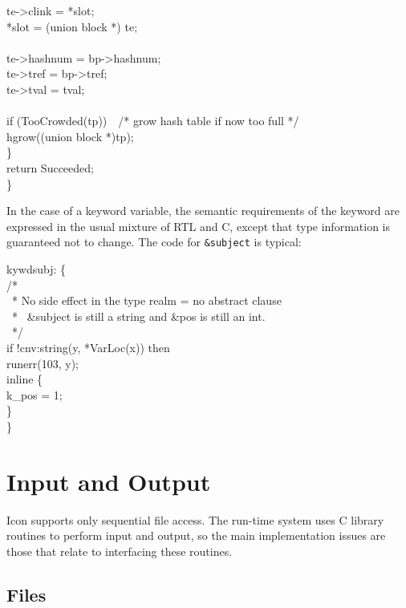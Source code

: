 \begin{iconcode}
\>\>te->clink = *slot;\\
\>\>*slot = (union block *) te;\\
\\
\>\>te->hashnum = bp->hashnum;\\
\>\>te->tref = bp->tref;\\
\>\>te->tval = tval;\\
\\
\>\>if (TooCrowded(tp))\ \ /* grow hash table if now too full */\\
\>\>\>hgrow((union block *)tp);\\
\>\>\}\\
\>return Succeeded;\\
\}
\end{iconcode}

In the case of a keyword variable, the semantic requirements
of the keyword are expressed in the usual mixture of RTL and C, except
that type information is guaranteed not to change. The code for
\texttt{\&subject} is typical:

\begin{iconcode}
\>\>kywdsubj: \{\\
\>\>\>/*\\
\>\>\>\ * No side effect in the type realm = no abstract clause\\
\>\>\>\ * \ \&subject is still a string and \&pos is still an int.\\
\>\>\>\ */\\
\>\>\>if !cnv:string(y, *VarLoc(x)) then\\
\>\>\>\>runerr(103, y);\\
\>\>\>inline \{\\
\>\>\>\>k\_pos = 1;\\
\>\>\>\>\}\\
\>\>\>\}
\end{iconcode}

\section{Input and Output}

Icon supports only sequential file access. The run-time system uses C
library routines to perform input and output, so the main
implementation issues are those that relate to interfacing these
routines.

\subsection{Files}

